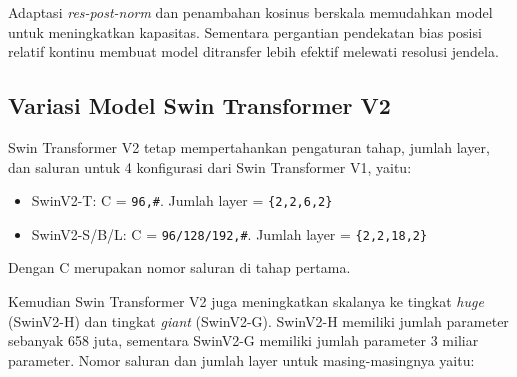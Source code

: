 

Adaptasi \emph{res-post-norm} dan penambahan kosinus berskala memudahkan model untuk \linebreak meningkatkan kapasitas. Sementara pergantian pendekatan bias posisi relatif kontinu membuat model ditransfer lebih 
efektif melewati resolusi jendela.\parencite{Liuv22021}

\subsection{Variasi Model Swin Transformer V2}

Swin Transformer V2 tetap mempertahankan pengaturan tahap, jumlah layer, dan saluran untuk 4 konfigurasi dari Swin Transformer V1, yaitu:

\begin{itemize}[nolistsep]

  \item SwinV2-T: C = \verb|96,#|. Jumlah layer = \verb|{2,2,6,2}|

  \item SwinV2-S/B/L: C = \verb|96/128/192,#|. Jumlah layer = \verb|{2,2,18,2}|

\end{itemize}

Dengan C merupakan nomor saluran di tahap pertama.

Kemudian Swin Transformer V2 juga meningkatkan skalanya ke tingkat \emph{huge} (SwinV2-H) dan tingkat \emph{giant} (SwinV2-G). SwinV2-H memiliki jumlah parameter sebanyak 658 juta, sementara SwinV2-G memiliki 
jumlah parameter 3 miliar parameter. Nomor saluran dan jumlah layer untuk masing-masingnya yaitu:

